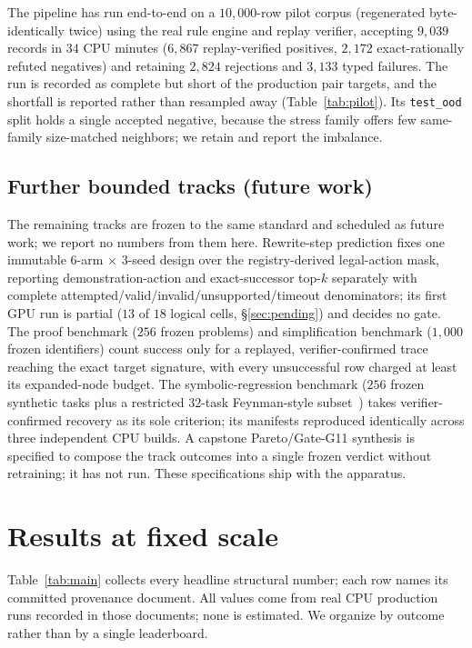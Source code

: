 \documentclass[11pt]{article}
\begin{document}
The pipeline has run end-to-end on a $10{,}000$-row pilot corpus (regenerated
byte-identically twice) using the real rule engine and replay verifier,
accepting $9{,}039$ records in $34$ CPU minutes ($6{,}867$ replay-verified
positives, $2{,}172$ exact-rationally refuted negatives) and retaining
$2{,}824$ rejections and $3{,}133$ typed failures. The run is recorded as
complete but short of the production pair
targets, and the shortfall is reported rather than resampled away
(Table~\ref{tab:pilot}). Its \texttt{test\_ood} split holds a single accepted
negative, because the stress family offers few same-family size-matched
neighbors; we retain and report the imbalance.

\subsection{Further bounded tracks (future work)}
\label{sec:unrun}

The remaining tracks are frozen to the same standard and scheduled as future
work; we report no numbers from them here. Rewrite-step prediction fixes one
immutable $6$-arm $\times$ $3$-seed design over the registry-derived
legal-action mask, reporting demonstration-action and exact-successor top-$k$
separately with complete attempted/valid/invalid/unsupported/timeout
denominators; its first GPU run is partial ($13$ of $18$ logical cells,
\S\ref{sec:pending}) and decides no gate. The proof benchmark
($256$ frozen problems) and simplification benchmark ($1{,}000$ frozen
identifiers) count success only for a replayed, verifier-confirmed trace reaching
the exact target signature, with every unsuccessful row charged at least its
expanded-node budget. The symbolic-regression benchmark ($256$ frozen synthetic
tasks plus a restricted $32$-task Feynman-style subset~\cite{udrescu2020ai})
takes verifier-confirmed recovery as its sole criterion; its manifests reproduced
identically across three independent CPU builds. A capstone Pareto/Gate-G11
synthesis is specified to compose the track outcomes into a single frozen
verdict without retraining; it has not run. These specifications ship with the
apparatus.

\section{Results at fixed scale}
\label{sec:results}

Table~\ref{tab:main} collects every headline structural number; each row names its
committed provenance document. All values come from real CPU production runs
recorded in those documents; none is estimated. We organize by outcome rather
than by a single leaderboard.
\end{document}

